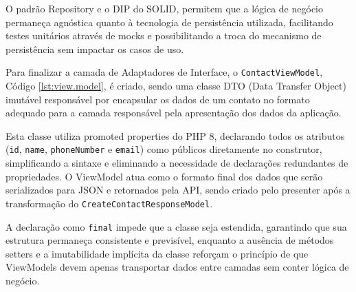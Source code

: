     \par O padrão Repository e o DIP do SOLID, permitem que a lógica de negócio permaneça agnóstica quanto à tecnologia de persistência utilizada, facilitando testes unitários através de mocks e possibilitando a troca do mecanismo de persistência sem impactar os casos de uso.

    \par Para finalizar a camada de Adaptadores de Interface, o \texttt{ContactViewModel}, Código \ref{lst:view.model}, é criado, sendo uma classe DTO (Data Transfer Object) imutável responsável por encapsular os dados de um contato no formato adequado para a camada responsável pela apresentação dos dados da aplicação. 

    
    
    \par Esta classe utiliza promoted properties do PHP 8, declarando todos os atributos (\texttt{id}, \texttt{name}, \texttt{phoneNumber} e \texttt{email}) como públicos diretamente no construtor, simplificando a sintaxe e eliminando a necessidade de declarações redundantes de propriedades. O ViewModel atua como o formato final dos dados que serão serializados para JSON e retornados pela API, sendo criado pelo presenter após a transformação do \texttt{CreateContactResponseModel}.
    
    \par A declaração como \texttt{final} impede que a classe seja estendida, garantindo que sua estrutura permaneça consistente e previsível, enquanto a ausência de métodos setters e a imutabilidade implícita da classe reforçam o princípio de que ViewModels devem apenas transportar dados entre camadas sem conter lógica de negócio.
